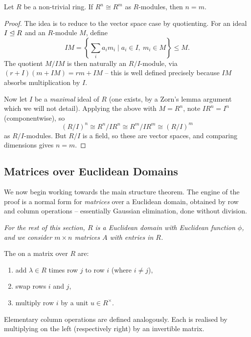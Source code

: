 \documentclass[a4paper]{scrartcl}
\begin{document}
\begin{proposition}
	Let $R$ be a non-trivial ring. If $R^n \cong R^m$ as $R$-modules, then $n = m$.
\end{proposition}
\begin{proof}
	The idea is to reduce to the vector space case by quotienting. For an ideal $I \trianglelefteq R$ and an $R$-module $M$, define
	$$
	IM = \left\{\textstyle\sum_i a_i m_i \mid a_i \in I,\ m_i \in M\right\} \leq M.
	$$
	The quotient $M/IM$ is then naturally an $R/I$-module, via $(r + I)(m + IM) = rm + IM$ -- this is well defined precisely because $IM$ absorbs multiplication by $I$.

	Now let $I$ be a \emph{maximal} ideal of $R$ (one exists, by a Zorn's lemma argument which we will not detail). Applying the above with $M = R^n$, note $I R^n = I^n$ (componentwise), so
	$$
	(R/I)^n \cong R^n / I R^n \cong R^m/I R^m \cong (R/I)^m
	$$
	as $R/I$-modules. But $R/I$ is a field, so these are vector spaces, and comparing dimensions gives $n = m$.
\end{proof}

\subsection{Matrices over Euclidean Domains}

We now begin working towards the main structure theorem. The engine of the proof is a normal form for \emph{matrices} over a Euclidean domain, obtained by row and column operations -- essentially Gaussian elimination, done without division.

\emph{For the rest of this section, $R$ is a Euclidean domain with Euclidean function $\phi$, and we consider $m \times n$ matrices $A$ with entries in $R$.}

\begin{definition}
	The  on a matrix over $R$ are:
	\begin{enumerate}[label=(\roman*)]
		\item add $\lambda \in R$ times row $j$ to row $i$ (where $i \neq j$),
		\item swap rows $i$ and $j$,
		\item multiply row $i$ by a unit $u \in R^{\times}$.
	\end{enumerate}
	Elementary column operations are defined analogously. Each is realised by multiplying on the left (respectively right) by an invertible matrix.
\end{definition}
\end{document}
